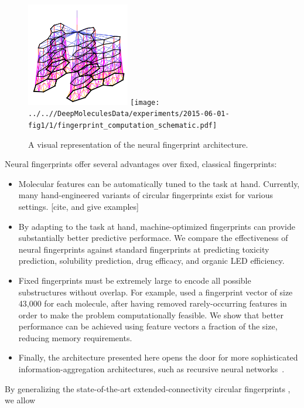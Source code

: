 \documentclass{article}
\begin{document}
\begin{figure}
\centerline{\includegraphics[width=0.4\textwidth]{figures/3d-nets/net1}
\texttt{[image: ../..//DeepMoleculesData/experiments/2015-06-01-fig1/1/fingerprint\_computation\_schematic.pdf]}
}
\caption{A visual representation of the neural fingerprint architecture.}
\label{fig:architecture sketch}
\end{figure}

Neural fingerprints offer several advantages over fixed, classical fingerprints:
\begin{itemize}
\item Molecular features can be automatically tuned to the task at hand.
Currently, many hand-engineered variants of circular fingerprints exist for various settings. [cite, and give examples]
\item By adapting to the task at hand, machine-optimized fingerprints can provide substantially better predictive performace.
We compare the effectiveness of neural fingerprints against standard fingerprints at predicting toxicity prediction, solubility prediction, drug efficacy, and organic LED efficiency.
\item Fixed fingerprints must be extremely large to encode all possible substructures without overlap.
For example, \cite{unterthinerdeep} used a fingerprint vector of size 43,000 for each molecule, after having removed rarely-occurring features in order to make the problem computationally feasible.
We show that better performance can be achieved using feature vectors a fraction of the size, reducing memory requirements.
\item Finally, the architecture presented here opens the door for more sophisticated information-aggregation architectures, such as recursive neural networks~\citep{socher2011semi, socher2011dynamic}.
\end{itemize}

By generalizing the state-of-the-art extended-connectivity circular fingerprints , we allow
\end{document}
